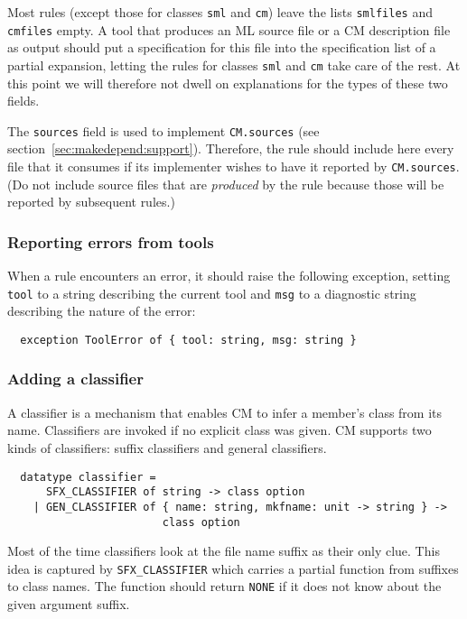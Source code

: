 Most rules (except those for classes {\tt sml} and {\tt cm}) leave the
lists {\tt smlfiles} and {\tt cmfiles} empty.  A tool that produces an
ML source file or a CM description file as output should put a
specification for this file into the specification list of a partial
expansion, letting the rules for classes {\tt sml} and {\tt cm} take
care of the rest.  At this point we will therefore not dwell on
explanations for the types of these two fields.

The {\tt sources} field is used to implement {\tt CM.sources} (see
section~\ref{sec:makedepend:support}).  Therefore, the rule should
include here every file that it consumes if its implementer wishes to
have it reported by {\tt CM.sources}.  (Do not include source files
that are {\em produced} by the rule because those will be reported by
subsequent rules.)

\subsubsection{Reporting errors from tools}

When a rule encounters an error, it should raise the following
exception, setting {\tt tool} to a string describing the current tool
and {\tt msg} to a diagnostic string describing the nature of the
error:

\begin{verbatim}
  exception ToolError of { tool: string, msg: string }
\end{verbatim}

\subsubsection{Adding a classifier}

A classifier is a mechanism that enables CM to infer a member's class
from its name.  Classifiers are invoked if no explicit class was
given.  CM supports two kinds of classifiers: suffix classifiers and
general classifiers.

\begin{verbatim}
  datatype classifier =
      SFX_CLASSIFIER of string -> class option
    | GEN_CLASSIFIER of { name: string, mkfname: unit -> string } ->
                        class option
\end{verbatim}

Most of the time classifiers look at the file name suffix as their only
clue.  This idea is captured by {\tt SFX\_CLASSIFIER} which carries a
partial function from suffixes to class names.  The function should
return {\tt NONE} if it does not know about the given argument suffix.

